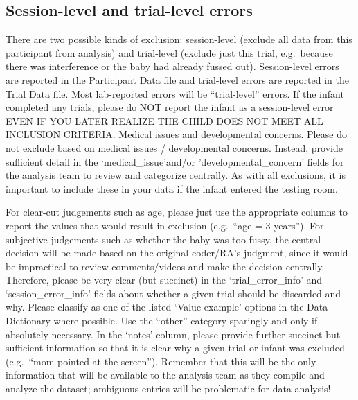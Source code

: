 \documentclass[
]{book}
\begin{document}
\subsection{Session-level and trial-level errors}\label{session-level-and-trial-level-errors}

There are two possible kinds of exclusion: session-level (exclude all data from this participant from analysis) and trial-level (exclude just this trial, e.g.~because there was interference or the baby had already fussed out). Session-level errors are reported in the Participant Data file and trial-level errors are reported in the Trial Data file. Most lab-reported errors will be ``trial-level'' errors.
If the infant completed any trials, please do NOT report the infant as a session-level error EVEN IF YOU LATER REALIZE THE CHILD DOES NOT MEET ALL INCLUSION CRITERIA.
Medical issues and developmental concerns. Please do not exclude based on medical issues / developmental concerns. Instead, provide sufficient detail in the `medical\_issue'and/or 'developmental\_concern' fields for the analysis team to review and categorize centrally. As with all exclusions, it is important to include these in your data if the infant entered the testing room.

For clear-cut judgements such as age, please just use the appropriate columns to report the values that would result in exclusion (e.g.~``age = 3 years'').
For subjective judgements such as whether the baby was too fussy, the central decision will be made based on the original coder/RA's judgment, since it would be impractical to review comments/videos and make the decision centrally. Therefore, please be very clear (but succinct) in the `trial\_error\_info' and `session\_error\_info' fields about whether a given trial should be discarded and why. Please classify as one of the listed `Value example' options in the Data Dictionary where possible. Use the ``other'' category sparingly and only if absolutely necessary. In the `notes' column, please provide further succinct but sufficient information so that it is clear why a given trial or infant was excluded (e.g.~``mom pointed at the screen''). Remember that this will be the only information that will be available to the analysis team as they compile and analyze the dataset; ambiguous entries will be problematic for data analysis!
\end{document}
